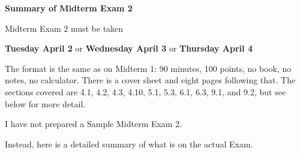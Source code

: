 \documentclass[12pt]{article}
\begin{document}
\phantom{k}
\vspace{3mm}
\Large\centerline{\textbf{Summary of Midterm Exam 2}} \normalsize

\bigskip
Midterm Exam 2 must be taken

\medskip
\centerline{\textbf{Tuesday April 2} or \textbf{Wednesday April 3} or \textbf{Thursday April 4}}

The format is the same as on Midterm 1: 90 minutes, 100 points, no book, no notes, no calculator.  There is a cover sheet and eight pages following that.  The sections covered are 4.1, 4.2, 4.3, 4.10, 5.1, 5.3, 6.1, 6.3, 9.1, and 9.2, but see below for more detail.

I have not prepared a Sample Midterm Exam 2.

Instead, here is a detailed summary of what is on the actual Exam.

\medskip
\end{document}
